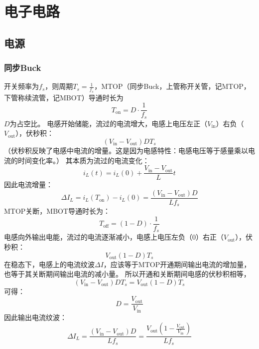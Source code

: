 \chapter{电子电路}

\section{电源}

    \subsection{同步Buck}
    开关频率为$f_s$，则周期$T_s=\frac{1}{f_s}$，MTOP（同步Buck，上管称开关管，记MTOP，下管称续流管，记MBOT）导通时长为
    \begin{equation}
        T_\mathrm{on}=D\cdot\frac{1}{f_s}
    \end{equation}
    $D$为占空比。
    电感开始储能，流过的电流增大，电感上电压左正（$V_\mathrm{in}$）右负（$V_\mathrm{out}$），伏秒积：
    \begin{equation}
        (V_\mathrm{in}-V_\mathrm{out})DT_s
    \end{equation}
    （伏秒积反映了电感中电流的增量。这是因为电感特性：电感电压等于感量乘以电流的时间变化率。）
    其本质为流过的电流变化：
    \begin{equation}
        i_L(t)=i_L(0)+\frac{V_\mathrm{in}-V_\mathrm{out}}{L}t
    \end{equation}
    因此电流增量：
    \begin{equation}
        \Delta I_L=i_L(T_\mathrm{on})-i_L(0)=\frac{\left(V_\mathrm{in}-V_\mathrm{out}\right)D}{Lf_s}
    \end{equation}
    MTOP关断，MBOT导通时长为：
    \begin{equation}
        T_\mathrm{off}=(1-D)\cdot\frac{1}{f_s}
    \end{equation}
    电感向外输出电能，流过的电流逐渐减小，电感上电压左负（0）右正（$V_\mathrm{out}$），伏秒积：
    \begin{equation}
        V_\mathrm{out}(1-D)T_s
    \end{equation}
    在稳态下，电感上的电流纹波$\Delta I$，应该等于MTOP开通期间输出电流的增加量，也等于其关断期间输出电流的减小量。
    所以开通和关断期间电感的伏秒积相等，
    \begin{equation}
        (V_\mathrm{in}-V_\mathrm{out})DT_s=V_\mathrm{out}(1-D)T_s
    \end{equation}
    可得：
    \begin{equation}
        D=\frac{V_\mathrm{out}}{V_\mathrm{in}}
    \end{equation}
    因此输出电流纹波：
    \begin{equation}
        \Delta I_L=\frac{\left(V_\mathrm{in}-V_\mathrm{out}\right)D}{Lf_s}=\frac{V_\mathrm{out}\left(1-\frac{V_\mathrm{out}}{V_\mathrm{in}}\right)}{Lf_s}
    \end{equation}

